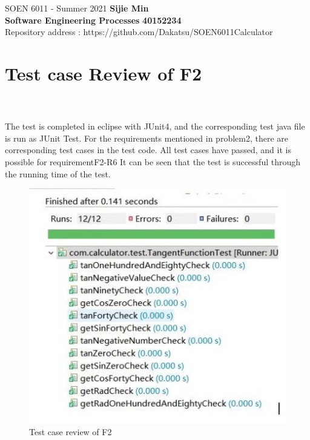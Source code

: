 \documentclass[letterpaper, 11pt]{report}
\begin{document}
\pagebreak

\section*{}
\normalsize {SOEN 6011 - Summer 2021} \hfill \textbf{Sijie Min} \\
\textbf{ Software Engineering Processes}  \hfill \textbf{40152234} \\
\hfill Repository address : https://github.com/Dakatsu/SOEN6011Calculator
\\
\section*{Test case Review of F2}

\\\\The test is completed in eclipse with JUnit4, and the corresponding test java file is run as JUnit Test. For the requirements mentioned in problem2, there are corresponding test cases in the test code. All test cases have passed, and it is possible for requirementF2-R6 It can be seen that the test is successful through the running time of the test.

\begin{figure}[htp]
    \centering
    \includegraphics[width=16cm]{SOEN_6011-Problem-7/F5P7.jpg}
    \caption{Test case review of F2}
    \label{fig:galaxy}
\end{figure}
 \begin{center} 
\end{center}
\end{document}
